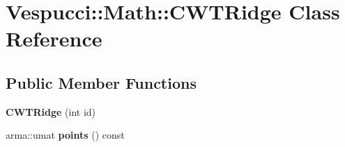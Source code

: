 \hypertarget{class_vespucci_1_1_math_1_1_c_w_t_ridge}{\section{Vespucci\+:\+:Math\+:\+:C\+W\+T\+Ridge Class Reference}
\label{class_vespucci_1_1_math_1_1_c_w_t_ridge}
}
\subsection*{Public Member Functions}
\begin{DoxyCompactItemize}
\item 
\hypertarget{class_vespucci_1_1_math_1_1_c_w_t_ridge_abc64696867de953935fb7752eb7aa3c5}{{\bfseries C\+W\+T\+Ridge} (int id)}\label{class_vespucci_1_1_math_1_1_c_w_t_ridge_abc64696867de953935fb7752eb7aa3c5}

\item 
\hypertarget{class_vespucci_1_1_math_1_1_c_w_t_ridge_a9cb96470fb5099fb484f785b03062a61}{arma\+::umat {\bfseries points} () const }\label{class_vespucci_1_1_math_1_1_c_w_t_ridge_a9cb96470fb5099fb484f785b03062a61}


\end{DoxyCompactItemize}
